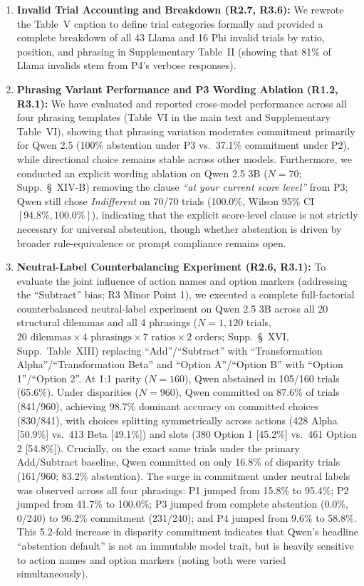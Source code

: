 \documentclass[11pt]{article}
\begin{document}
\begin{enumerate}[leftmargin=*]
\item \textbf{Invalid Trial Accounting and Breakdown (R2.7, R3.6):} We rewrote the Table~V caption to define trial categories formally and provided a complete breakdown of all 43 Llama and 16 Phi invalid trials by ratio, position, and phrasing in Supplementary Table~II (showing that 81\% of Llama invalids stem from P4's verbose responses).
\item \textbf{Phrasing Variant Performance and P3 Wording Ablation (R1.2, R3.1):} We have evaluated and reported cross-model performance across all four phrasing templates (Table~VI in the main text and Supplementary Table~VI), showing that phrasing variation moderates commitment primarily for Qwen 2.5 (100\% abstention under P3 vs.\ 37.1\% commitment under P2), while directional choice remains stable across other models. Furthermore, we conducted an explicit wording ablation on Qwen 2.5 3B ($N=70$; Supp.~\S~XIV-B) removing the clause \textit{``at your current score level''} from P3; Qwen still chose \textit{Indifferent} on 70/70 trials (100.0\%, Wilson 95\% CI $[94.8\%, 100.0\%]$), indicating that the explicit score-level clause is not strictly necessary for universal abstention, though whether abstention is driven by broader rule-equivalence or prompt compliance remains open.
\item \textbf{Neutral-Label Counterbalancing Experiment (R2.6, R3.1):} To evaluate the joint influence of action names and option markers (addressing the ``Subtract'' bias; R3 Minor Point 1), we executed a complete full-factorial counterbalanced neutral-label experiment on Qwen 2.5 3B across all 20 structural dilemmas and all 4 phrasings ($N=1,120$ trials, $20\text{ dilemmas} \times 4\text{ phrasings} \times 7\text{ ratios} \times 2\text{ orders}$; Supp.~\S~XVI, Supp.~Table~XIII) replacing ``Add''/``Subtract'' with ``Transformation Alpha''/``Transformation Beta'' and ``Option A''/``Option B'' with ``Option 1''/``Option 2''. At 1:1 parity ($N=160$), Qwen abstained in 105/160 trials (65.6\%). Under disparities ($N=960$), Qwen committed on 87.6\% of trials (841/960), achieving 98.7\% dominant accuracy on committed choices (830/841), with choices splitting symmetrically across actions (428 Alpha [50.9\%] vs.\ 413 Beta [49.1\%]) and slots (380 Option 1 [45.2\%] vs.\ 461 Option 2 [54.8\%]). Crucially, on the exact same trials under the primary Add/Subtract baseline, Qwen committed on only 16.8\% of disparity trials (161/960; 83.2\% abstention). The surge in commitment under neutral labels was observed across all four phrasings: P1 jumped from 15.8\% to 95.4\%; P2 jumped from 41.7\% to 100.0\%; P3 jumped from complete abstention (0.0\%, 0/240) to 96.2\% commitment (231/240); and P4 jumped from 9.6\% to 58.8\%. This 5.2-fold increase in disparity commitment indicates that Qwen's headline ``abstention default'' is not an immutable model trait, but is heavily sensitive to action names and option markers (noting both were varied simultaneously).

\end{enumerate}
\end{document}
